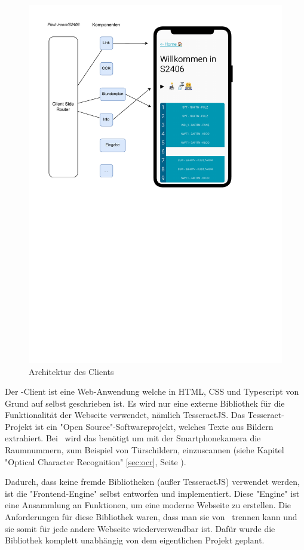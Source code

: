 
\begin{figure}[H]
    \centering
    \includegraphics[width=120mm]{media/Intro/client_arch.svg.pdf}
    \caption{Architektur des Clients}
\end{figure}

Der \ZELIA-Client ist eine Web-Anwendung welche in HTML, CSS und Typescript von Grund auf selbst geschrieben ist. Es wird nur eine externe Bibliothek für die Funktionalität der Webseite verwendet, nämlich TesseractJS. Das Tesseract-Projekt ist ein "Open Source"-Softwareprojekt, welches Texte aus Bildern extrahiert. Bei \ZELIA\ wird das benötigt um mit der Smartphonekamera die Raumnummern, zum Beispiel von Türschildern, einzuscannen (siehe Kapitel "Optical Character Recognition" \ref{sec:ocr}, Seite \pageref{sec:ocr}).

Dadurch, dass keine fremde Bibliotheken (außer TesseractJS) verwendet werden, ist die "Frontend-Engine" selbst entworfen und implementiert. Diese "Engine" ist eine Ansammlung an Funktionen, um eine moderne Webseite zu erstellen. Die Anforderungen für diese Bibliothek waren, dass man sie von \ZELIA\ trennen kann und sie somit für jede andere Webseite wiederverwendbar ist. Dafür wurde die Bibliothek komplett unabhängig von dem eigentlichen Projekt geplant. 

